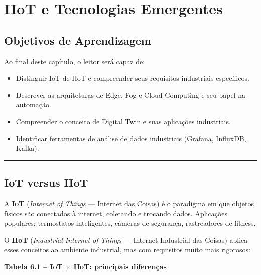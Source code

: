 \chapter{IIoT e Tecnologias Emergentes}\label{iiot-e-tecnologias-emergentes}

\section*{Objetivos de Aprendizagem}

Ao final deste capítulo, o leitor será capaz de:

\begin{itemize}
\tightlist
\item
  Distinguir IoT de IIoT e compreender seus requisitos industriais específicos.
\item
  Descrever as arquiteturas de Edge, Fog e Cloud Computing e seu papel na automação.
\item
  Compreender o conceito de Digital Twin e suas aplicações industriais.
\item
  Identificar ferramentas de análise de dados industriais (Grafana, InfluxDB, Kafka).
\end{itemize}

\begin{center}\rule{0.5\linewidth}{0.5pt}\end{center}

\section{IoT versus IIoT}\label{iot-versus-iiot}

A \textbf{IoT} (\emph{Internet of Things} --- Internet das Coisas) é o paradigma em que objetos físicos são conectados à internet, coletando e trocando dados. Aplicações populares: termostatos inteligentes, câmeras de segurança, rastreadores de fitness.

O \textbf{IIoT} (\emph{Industrial Internet of Things} --- Internet Industrial das Coisas) aplica esses conceitos ao ambiente industrial, mas com requisitos muito mais rigorosos:

\textbf{Tabela 6.1 -- IoT \ensuremath{\times} IIoT: principais diferenças}

